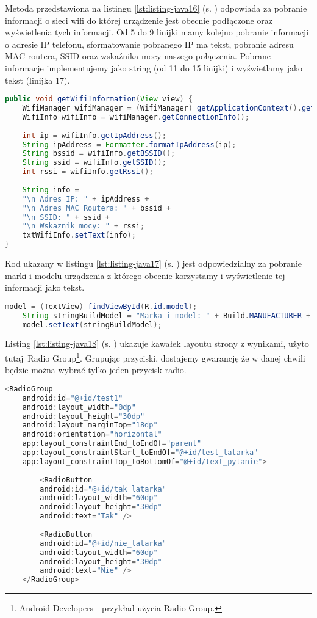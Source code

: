 \newpage

Metoda przedstawiona na listingu \ref{lst:listing-java16} (s. \pageref{lst:listing-java16}) odpowiada za pobranie informacji o sieci wifi do której urządzenie jest obecnie podłączone oraz wyświetlenia tych informacji. Od 5 do 9 linijki mamy kolejno pobranie informacji o adresie IP telefonu, sformatowanie pobranego IP ma tekst, pobranie adresu MAC routera, SSID oraz wskaźnika mocy naszego połączenia. Pobrane informacje implementujemy jako string (od 11 do 15 linijki) i wyświetlamy jako tekst (linijka 17).
\begin{lstlisting}[caption=Wifi - Pobieranie informacji o Wifi, label={lst:listing-java16}, language=Java]
    public void getWifiInformation(View view) {
	WifiManager wifiManager = (WifiManager) getApplicationContext().getSystemService(WIFI_SERVICE);
	WifiInfo wifiInfo = wifiManager.getConnectionInfo();
	
	int ip = wifiInfo.getIpAddress();
	String ipAddress = Formatter.formatIpAddress(ip);
	String bssid = wifiInfo.getBSSID();
	String ssid = wifiInfo.getSSID();
	int rssi = wifiInfo.getRssi();
		
	String info =
	"\n Adres IP: " + ipAddress +
	"\n Adres MAC Routera: " + bssid +
	"\n SSID: " + ssid +
	"\n Wskaznik mocy: " + rssi;
	txtWifiInfo.setText(info);	
}
\end{lstlisting}


Kod ukazany w listingu \ref{lst:listing-java17} (s. \pageref{lst:listing-java17}) jest odpowiedzialny za pobranie marki i modelu urządzenia z którego obecnie korzystamy i wyświetlenie tej informacji jako tekst.
\begin{lstlisting}[caption=Wyniki - Pobranie marki i modelu urządzenia, label={lst:listing-java17}, language=Java]
	model = (TextView) findViewById(R.id.model);
	String stringBuildModel = "Marka i model: " + Build.MANUFACTURER + " " + Build.MODEL;
	model.setText(stringBuildModel);
\end{lstlisting}

\newpage


Listing \ref{lst:listing-java18} (s. \pageref{lst:listing-java18}) ukazuje kawałek layoutu strony z wynikami, użyto tutaj~Radio Group\footnote{Android Developers - przykład użycia Radio Group\cite{www4}.}. Grupując przyciski, dostajemy gwarancję że w danej chwili będzie można wybrać tylko jeden przycisk radio.
\begin{lstlisting}[caption=Wyniki - Radio Group, label={lst:listing-java18}, language=Java]
	<RadioGroup
	android:id="@+id/test1"
	android:layout_width="0dp"
	android:layout_height="30dp"
	android:layout_marginTop="18dp"
	android:orientation="horizontal"
	app:layout_constraintEnd_toEndOf="parent"
	app:layout_constraintStart_toEndOf="@+id/test_latarka"
	app:layout_constraintTop_toBottomOf="@+id/text_pytanie">
	
		<RadioButton
		android:id="@+id/tak_latarka"
		android:layout_width="60dp"
		android:layout_height="30dp"
		android:text="Tak" />
		
		<RadioButton
		android:id="@+id/nie_latarka"
		android:layout_width="60dp"
		android:layout_height="30dp"
		android:text="Nie" />
	</RadioGroup>
\end{lstlisting}




